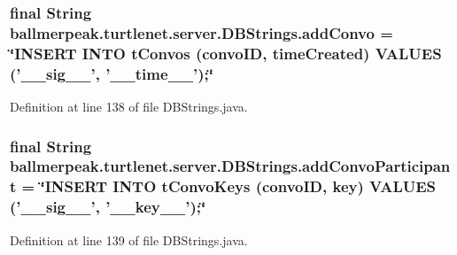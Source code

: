 \hypertarget{classballmerpeak_1_1turtlenet_1_1server_1_1DBStrings_ac332d75426a3fc552c1492ca1c14701c}{
\subsubsection[{add\-Convo}]{\setlength{\rightskip}{0pt plus 5cm}final String ballmerpeak.\-turtlenet.\-server.\-D\-B\-Strings.\-add\-Convo = \char`\"{}I\-N\-S\-E\-R\-T I\-N\-T\-O t\-Convos (convo\-I\-D, time\-Created) V\-A\-L\-U\-E\-S ('\-\_\-\-\_\-sig\-\_\-\-\_\-', '\-\_\-\-\_\-time\-\_\-\-\_\-');\char`\"{}\hspace{0.3cm}{\ttfamily [static]}}}\label{classballmerpeak_1_1turtlenet_1_1server_1_1DBStrings_ac332d75426a3fc552c1492ca1c14701c}


Definition at line 138 of file D\-B\-Strings.\-java.

\hypertarget{classballmerpeak_1_1turtlenet_1_1server_1_1DBStrings_a2ef3257d6674eeb1d1eb0db4427eee3f}{
\subsubsection[{add\-Convo\-Participant}]{\setlength{\rightskip}{0pt plus 5cm}final String ballmerpeak.\-turtlenet.\-server.\-D\-B\-Strings.\-add\-Convo\-Participant = \char`\"{}I\-N\-S\-E\-R\-T I\-N\-T\-O t\-Convo\-Keys (convo\-I\-D, key) V\-A\-L\-U\-E\-S ('\-\_\-\-\_\-sig\-\_\-\-\_\-', '\-\_\-\-\_\-key\-\_\-\-\_\-');\char`\"{}\hspace{0.3cm}{\ttfamily [static]}}}\label{classballmerpeak_1_1turtlenet_1_1server_1_1DBStrings_a2ef3257d6674eeb1d1eb0db4427eee3f}


Definition at line 139 of file D\-B\-Strings.\-java.


